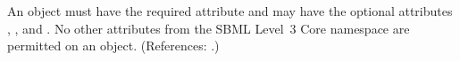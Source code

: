 An \EventAssignment object must have the required attribute
 and may have the optional attributes , ,  and
.  No other attributes from the SBML Level~3 Core namespace
are permitted on an \EventAssignment object.  (References: .)
